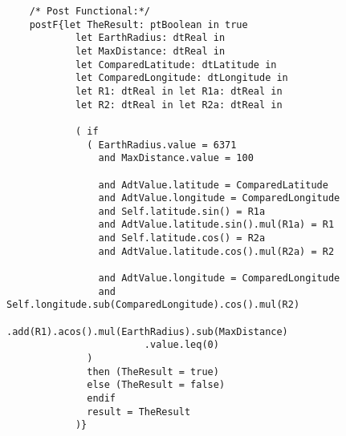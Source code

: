 	\scriptsize
	\vspace{0.5cm}
	\begin{lstlisting}[style=MessirStyle,firstnumber=auto,captionpos=b,caption={\msrmessir (MCL-oriented) specification of the operation \emph{isNearTo}.},label=OM-dtGPSLocation-isNearTo-MCL-LST]

	
	
	/* Post Functional:*/ 
	postF{let TheResult: ptBoolean in true
	        let EarthRadius: dtReal in
	        let MaxDistance: dtReal in
	        let ComparedLatitude: dtLatitude in
	        let ComparedLongitude: dtLongitude in
	        let R1: dtReal in let R1a: dtReal in
	        let R2: dtReal in let R2a: dtReal in
	        
	        ( if
	          ( EarthRadius.value = 6371
	            and MaxDistance.value = 100
	            
	            and AdtValue.latitude = ComparedLatitude
	            and AdtValue.longitude = ComparedLongitude
	            and Self.latitude.sin() = R1a
	            and AdtValue.latitude.sin().mul(R1a) = R1
	            and Self.latitude.cos() = R2a
	            and AdtValue.latitude.cos().mul(R2a) = R2
	            
	            and AdtValue.longitude = ComparedLongitude
	            and Self.longitude.sub(ComparedLongitude).cos().mul(R2)
	                    .add(R1).acos().mul(EarthRadius).sub(MaxDistance)
	                    .value.leq(0)
	          )
	          then (TheResult = true)
	          else (TheResult = false)
	          endif
	          result = TheResult
	        )}
	
	
	\end{lstlisting}
	\normalsize 
	
	
	
	





